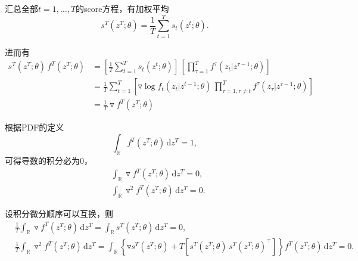汇总全部$t=1,\ldots,T$的score方程，有加权平均
\begin{equation}
    \label{eq:qlme-ime-def}
    s^{T} \left( z^{T}; \theta \right) = \frac{1}{T} \sum_{t=1}^{T} s_{t}  \left(z^{t}; \theta \right).
\end{equation}

进而有
\begin{equation}
    \label{eq:qmle-ime-mid-equality}
    \begin{split}
        s^{T} \left(z^{T}; \theta \right) \, f^{T} \left(z^{T}; \theta \right) & =
        \left[
        \frac{1}{T} \sum_{t=1}^{T} s_{t} \left(z^{t}; \theta \right)
        \right] \,
        \left[
        \prod_{\tau=1}^{T} f^{\tau} \left(z_{t} | z^{\tau-1} ; \theta \right)
        \right] \\
        & = \frac{1}{T} \sum_{t=1}^{T}
        \left[
        \triangledown \log f_{t} \left(z_{t} | z^{t-1}; \theta \right) \,
        \prod_{\tau=1,\tau \neq t}^{T} f^{\tau} \left(z_{\tau} | z^{\tau - 1}; \theta \right)
        \right] \\
        & = \frac{1}{T} \triangledown f^{T} \left(z^{T}; \theta \right)
    \end{split}
\end{equation}

根据PDF的定义
\begin{equation*}
    \int_{\mathbb{R}} f^{T} \left(z^{T}; \theta \right) \, \mathrm{d} z^{T} = 1,
\end{equation*}
可得导数的积分必为$0$，
\begin{align*}
    & \int_{\mathbb{R}} \triangledown f^{T} \left(z^{T}; \theta \right) \, \mathrm{d} z^{T} = 0, \\
    & \int_{\mathbb{R}} \triangledown^{2} f^{T} \left(z^{T}; \theta \right) \, \mathrm{d} z^{T} = 0.
\end{align*}

设积分微分顺序可以互换，则
\begin{align}
    \label{eq:qmle-ime-mid-int1}
    & \frac{1}{T} \int_{\mathbb{R}} \triangledown f^{T} \left( z^{T}; \theta \right) \, \mathrm{d} z^{T} = \int_{\mathbb{R}} s^{T} \left(z^{T}; \theta \right) \, \mathrm{d} z^{T} =0, \\
    \label{eq:qmle-ime-mid-int2}
    & \frac{1}{T} \int_{\mathbb{R}} \triangledown^{2} f^{T} \left(z^{T}; \theta \right) \, \mathrm{d} z^{T} = \int_{\mathbb{R}}
    \left\{
    \triangledown s^{T} \left( z^{T}; \theta \right)
    + T \left[
    s^{T} \left(z^{T} ; \theta \right) \, s^{T} \left(z^{T} ; \theta \right)^{\top}
    \right]
    \right\} f^{T} \left(z^{T}; \theta \right)
    \, \mathrm{d} z^{T} =0.
\end{align}

